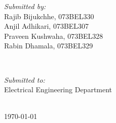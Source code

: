 \begin{titlepage}
	\begin{minipage}{0.4\textwidth}
		\begin{flushleft} 
			\emph{Submitted by:}\\
			Rajib Bijukchhe, 073BEL330\\
			Anjil Adhikari, 073BEL307\\
			Praveen Kushwaha, 073BEL328\\
			Rabin Dhamala, 073BEL329\\
		\end{flushleft}
	\end{minipage}
	~	
	\begin{minipage}{0.4\textwidth}
		\begin{flushright} 
			\emph{Submitted to:} \\
			Electrical Engineering Department \\
		\end{flushright}
	\end{minipage}\\[2cm]



	{\large \today}\\[2cm] %




	\vfill %
\end{titlepage}

